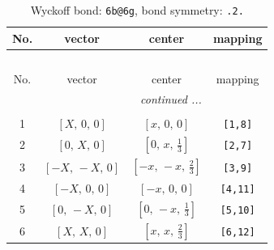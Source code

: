 \documentclass[fleqn,8pt]{jsarticle}
\begin{document}
\begin{longtable}{cccc}
\caption{Wyckoff bond: {\tt 6b@6g}, bond symmetry: {\tt .2.}}
 \\
 \hline \hline
No. & vector & center & mapping \\ \hline \endfirsthead

\multicolumn{3}{l}{\tablename\ \thetable{}} \\
 \hline \hline
No. & vector & center & mapping \\ \hline \endhead

 \hline \hline
\multicolumn{3}{r}{\footnotesize\it continued ...} \\ \endfoot

 \hline \hline
\multicolumn{3}{r}{} \\ \endlastfoot

1 & $\left[ X,\, 0,\, 0 \right]$ & $\left[ x,\, 0,\, 0 \right]$ & {\tt [1,8]} \\ \hline
2 & $\left[ 0,\, X,\, 0 \right]$ & $\left[ 0,\, x,\, \frac{1}{3} \right]$ & {\tt [2,7]} \\ \hline
3 & $\left[ - X,\, - X,\, 0 \right]$ & $\left[ - x,\, - x,\, \frac{2}{3} \right]$ & {\tt [3,9]} \\ \hline
4 & $\left[ - X,\, 0,\, 0 \right]$ & $\left[ - x,\, 0,\, 0 \right]$ & {\tt [4,11]} \\ \hline
5 & $\left[ 0,\, - X,\, 0 \right]$ & $\left[ 0,\, - x,\, \frac{1}{3} \right]$ & {\tt [5,10]} \\ \hline
6 & $\left[ X,\, X,\, 0 \right]$ & $\left[ x,\, x,\, \frac{2}{3} \right]$ & {\tt [6,12]} \\
\end{longtable}
\renewcommand{\arraystretch}{1.2}
\end{document}
